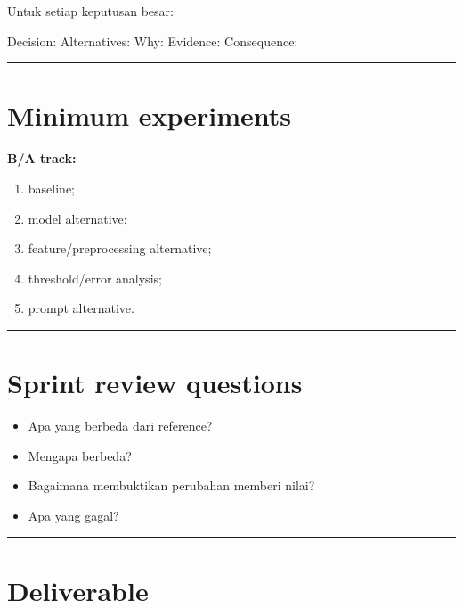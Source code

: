 \documentclass[
  indonesian,
  letterpaper,
  DIV=11,
  numbers=noendperiod]{scrreprt}
\newenvironment{Shaded}{\begin{snugshade}}{\end{snugshade}}
\newcommand{\NormalTok}[1]{\textcolor[rgb]{0.00,0.23,0.31}{#1}}
\providecommand{\tightlist}{%
  \setlength{\itemsep}{0pt}\setlength{\parskip}{0pt}}
\begin{document}
Untuk setiap keputusan besar:

\begin{Shaded}
\begin{Highlighting}[]
\NormalTok{Decision:}
\NormalTok{Alternatives:}
\NormalTok{Why:}
\NormalTok{Evidence:}
\NormalTok{Consequence:}
\end{Highlighting}
\end{Shaded}

\begin{center}\rule{0.5\linewidth}{0.5pt}\end{center}

\section{Minimum experiments}\label{minimum-experiments}

\textbf{B/A track:}

\begin{enumerate}
\def\labelenumi{\arabic{enumi}.}
\tightlist
\item
  baseline;
\item
  model alternative;
\item
  feature/preprocessing alternative;
\item
  threshold/error analysis;
\item
  prompt alternative.
\end{enumerate}

\begin{center}\rule{0.5\linewidth}{0.5pt}\end{center}

\section{Sprint review questions}\label{sprint-review-questions}

\begin{itemize}
\tightlist
\item
  Apa yang berbeda dari reference?
\item
  Mengapa berbeda?
\item
  Bagaimana membuktikan perubahan memberi nilai?
\item
  Apa yang gagal?
\end{itemize}

\begin{center}\rule{0.5\linewidth}{0.5pt}\end{center}

\section{Deliverable}\label{deliverable-7}
\end{document}
